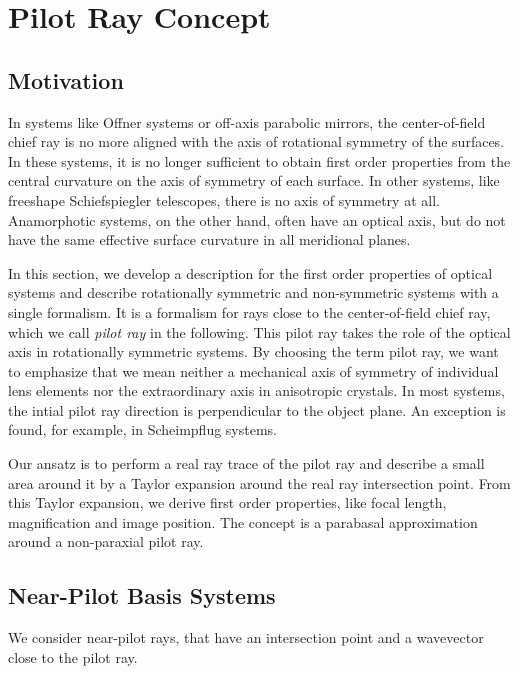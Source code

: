 \documentclass[12pt,a4paper,twoside,openright,BCOR10mm,headsepline,titlepage,abstracton,chapterprefix,final]{scrreprt}
\begin{document}
\section{Pilot Ray Concept}

\subsection{Motivation}

In systems like Offner systems or off-axis parabolic mirrors, the center-of-field chief ray is no more aligned with the axis of rotational symmetry of the surfaces.
In these systems, it is no longer sufficient to obtain first order properties from the central curvature on the axis of symmetry of each surface.
In other systems, like freeshape Schiefspiegler telescopes, there is no axis of symmetry at all. 
Anamorphotic systems, on the other hand, often have an optical axis, but do not have the same effective surface curvature in all meridional planes.

In this section, we develop a description for the first order properties of optical systems 
and describe rotationally symmetric and non-symmetric systems with a single formalism.
It is a formalism for rays close to the center-of-field chief ray, which we call \emph{pilot ray} in the following.
This pilot ray takes the role of the optical axis in rotationally symmetric systems. 
By choosing the term pilot ray, we want to emphasize that we mean neither a mechanical axis of symmetry of individual lens elements nor the extraordinary axis in anisotropic crystals.
In most systems, the intial pilot ray direction is perpendicular to the object plane. 
An exception is found, for example, in Scheimpflug systems.

Our ansatz is to perform a real ray trace of the pilot ray and describe a small area around it by a Taylor expansion around the real ray intersection point.
From this Taylor expansion, we derive first order properties, like focal length, magnification and image position.
The concept is a parabasal approximation around a non-paraxial pilot ray.



\subsection{Near-Pilot Basis Systems}

We consider near-pilot rays, that have an intersection point and a wavevector close to the pilot ray.
\end{document}
